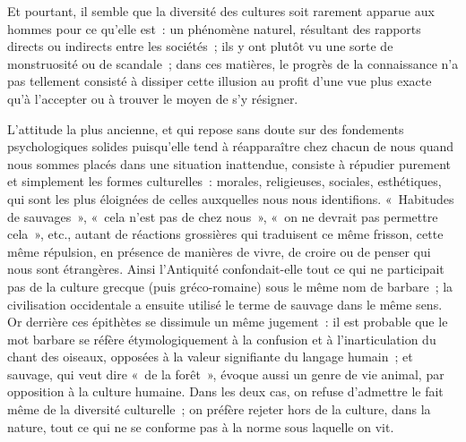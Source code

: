 \documentclass[french,twoside]{book} %
\begin{document}
\noindent Et pourtant, il semble que la diversité des cultures soit rarement apparue aux hommes pour ce qu’elle est : un phénomène naturel, résultant des rapports directs ou indirects entre les sociétés ; ils y ont plutôt vu une sorte de monstruosité ou de scandale ; dans ces matières, le progrès de la connaissance n’a pas tellement consisté à dissiper cette illusion au profit d’une vue plus exacte qu’à l’accepter ou à trouver le moyen de s’y résigner.\par
L’attitude la plus ancienne, et qui repose sans doute sur des fondements psychologiques solides puisqu’elle tend à réapparaître chez chacun de nous quand nous sommes placés dans une situation inattendue, consiste à répudier purement et simplement les formes culturelles : morales, religieuses, sociales, esthétiques, qui sont les plus éloignées de celles auxquelles nous nous identifions. « Habitudes de sauvages », « cela n’est pas de chez nous », « on ne devrait pas permettre cela », etc., autant de réactions grossières qui traduisent ce même frisson, cette même répulsion, en présence de manières de vivre, de croire ou de penser qui nous sont étrangères. Ainsi l’Antiquité confondait-elle tout ce qui ne participait pas de la culture grecque (puis gréco-romaine) sous le même nom de barbare ; la civilisation occidentale a ensuite utilisé le terme de sauvage dans le même sens. Or derrière ces épithètes se dissimule un même jugement : il est probable que le mot barbare se réfère étymologiquement à la confusion et à l’inarticulation du chant des oiseaux, opposées à la valeur signifiante du langage humain ; et sauvage, qui veut dire « de la forêt », évoque aussi un genre de vie animal, par opposition à la culture humaine. Dans les deux cas, on refuse d’admettre le fait même de la diversité culturelle ; on préfère rejeter hors de la culture, dans la nature, tout ce qui ne se conforme pas à la norme sous laquelle on vit.\par
\end{document}
